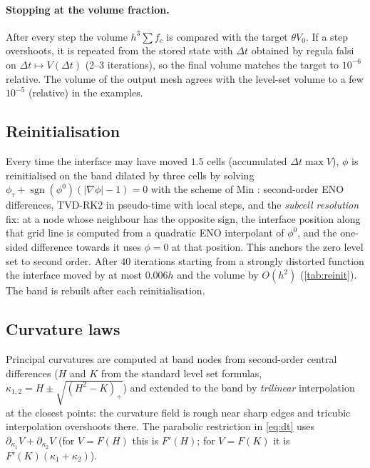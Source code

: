 \documentclass[11pt]{article}
\DeclareMathOperator{\sgn}{sgn}
\begin{document}
\paragraph{Stopping at the volume fraction.} After every step the volume $h^3\sum f_c$ is compared with the
target $\theta V_0$. If a step overshoots, it is repeated from the stored state with $\Delta t$ obtained by
regula falsi on $\Delta t\mapsto V(\Delta t)$ (2--3 iterations), so the final volume matches the target to
$10^{-6}$ relative. The volume of the output mesh agrees with the level-set volume to a few
$10^{-5}$ (relative) in the examples.

\subsection{Reinitialisation}

Every time the interface may have moved $1.5$ cells (accumulated $\Delta t\max V$), $\phi$ is reinitialised
on the band dilated by three cells by solving $\phi_\tau+\sgn(\phi^0)(|\nabla\phi|-1)=0$ with the scheme of
Min \cite{min10}: second-order ENO differences, TVD-RK2 in pseudo-time with local steps, and the
\emph{subcell resolution} fix: at a node whose neighbour has the opposite sign, the interface position
along that grid line is computed from a quadratic ENO interpolant of $\phi^0$, and the one-sided
difference towards it uses $\phi=0$ at that position. This anchors the zero level set to second order.
After $40$ iterations starting from a strongly distorted function the interface moved by at most
$0.006h$ and the volume by $O(h^2)$ (\cref{tab:reinit}). The band is rebuilt after each reinitialisation.

\begin{table}[h]
\centering\small

\caption{Reinitialisation of $\phi=(|x|-1)(1+0.4\sin3x\cos2y)+0.3(|x|-1)^2$ ($40$ iterations); $d$ is the
exact distance.}\label{tab:reinit}
\end{table}

\subsection{Curvature laws}

Principal curvatures are computed at band nodes from second-order central differences ($H$ and $K$ from
the standard level set formulas, $\kappa_{1,2}=H\pm\sqrt{(H^2-K)_+}$) and extended to the band by
\emph{trilinear} interpolation at the closest points: the curvature field is rough near sharp edges and
tricubic interpolation overshoots there. The parabolic restriction in \eqref{eq:dt} uses
$\partial_{\kappa_1}V+\partial_{\kappa_2}V$ (for $V=F(H)$ this is $F'(H)$; for $V=F(K)$ it is
$F'(K)(\kappa_1+\kappa_2)$).
\end{document}
